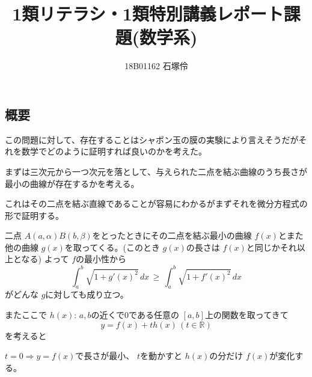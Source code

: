 \documentclass[dvipdfmx]{jsarticle}
\title{1類リテラシ・1類特別講義レポート課題(数学系)}
\author{18B01162 石塚伶}
\begin{document}
\maketitle
\subsection{概要}
この問題に対して、存在することはシャボン玉の膜の実験により言えそうだがそれを数学でどのように証明すれば良いのかを考えた。
\begin{multicols}{2}
    まずは三次元から一つ次元を落として、与えられた二点を結ぶ曲線のうち長さが最小の曲線が存在するかを考える。

    これはその二点を結ぶ直線であることが容易にわかるがまずそれを微分方程式の形で証明する。

    二点 $A(a,\alpha) B(b,\beta)$をとったときにその二点を結ぶ最小の曲線 $f(x)$とまた他の曲線 $g(x)$を取ってくる。(このとき $g(x)$の長さは $f(x)$と同じかそれ以上となる)
    よって $f$の最小性から
    \[
    \int_a^b \sqrt{1 + g'(x)^2} \, dx \, \geq \, \int_a^b \sqrt{1 + f'(x)^2} \, dx
    \]
    がどんな $g$に対しても成り立つ。

    またここで $h(x)$: $a,b$の近くで0である任意の $[a,b]$上の関数を取ってきて
    \[
    y = f(x) + th(x) \, (t \in \mathbb{R})
    \]
    を考えると

    $t = 0 \Rightarrow y = f(x)$で長さが最小、
    $t$を動かすと $h(x)$の分だけ $f(x)$が変化する。


\end{multicols}
\end{document}
